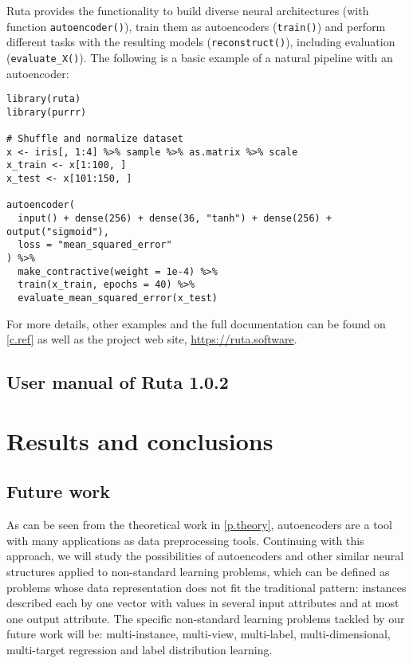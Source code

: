 \documentclass[oneside,openright,titlepage,numbers=noenddot,openany,headinclude,footinclude=true,
cleardoublepage=empty,abstractoff,BCOR=5mm,paper=a4,fontsize=12pt,main=spanish]{scrreprt}
\begin{document}
Ruta provides the functionality to build diverse neural architectures (with function \texttt{autoencoder()}), train them as autoencoders (\texttt{train()}) and perform different tasks with the resulting models (\texttt{reconstruct()}), including evaluation (\texttt{evaluate\_X()}). The following is a basic example of a natural pipeline with an autoencoder:
\begin{verbatim}
library(ruta)
library(purrr)

# Shuffle and normalize dataset
x <- iris[, 1:4] %>% sample %>% as.matrix %>% scale
x_train <- x[1:100, ]
x_test <- x[101:150, ]

autoencoder(
  input() + dense(256) + dense(36, "tanh") + dense(256) + output("sigmoid"),
  loss = "mean_squared_error"
) %>%
  make_contractive(weight = 1e-4) %>%
  train(x_train, epochs = 40) %>%
  evaluate_mean_squared_error(x_test)
\end{verbatim}

For more details, other examples and the full documentation can be found on \autoref{c.ref} as well as the project web site, \url{https://ruta.software}.

\chapter{User manual of Ruta 1.0.2}
\label{c.ref}



\part{Results and conclusions}

\chapter{Future work}

As can be seen from the theoretical work in \autoref{p.theory}, autoencoders are a tool with many applications as data preprocessing tools. Continuing with this approach, we will study the possibilities of autoencoders and other similar neural structures applied to non-standard learning problems, which can be defined as problems whose data representation does not fit the traditional pattern: instances described each by one vector with values in several input attributes and at most one output attribute. The specific non-standard learning problems tackled by our future work will be: multi-instance, multi-view, multi-label, multi-dimensional, multi-target regression and label distribution learning.
\end{document}
